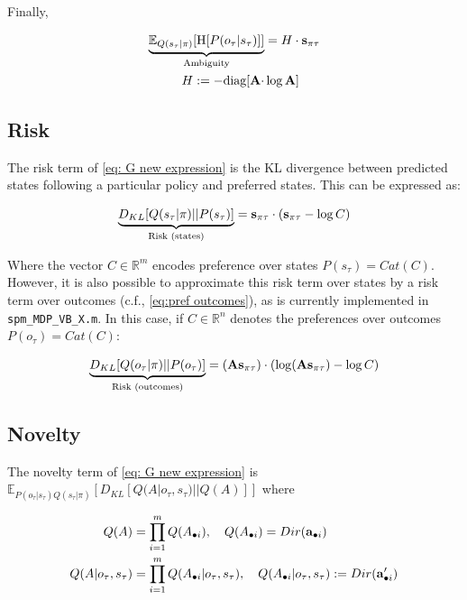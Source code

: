 \documentclass{article}
\begin{document}
	Finally,
	
	\begin{equation}
	\begin{split}
	 		\underbrace{\mathbb E_{Q(s_\tau|\pi)} [\text{H}[P(o_\tau |s_\tau)]]}_{\text{Ambiguity}} &= H\cdot \bold s_{\pi \tau} \\
	 		H := - \text{diag} [\bold A \cdot & \log \bold A ]
	\end{split}
	\end{equation}

	
	\subsection{Risk}
	
	The risk term of \eqref{eq: G new expression} is the KL divergence between predicted states following a particular policy and preferred states. This can be expressed as:
	
	\begin{equation}
		\underbrace{D_{KL}[Q(s_\tau|\pi)||P(s_\tau)]}_{\text{Risk (states)}}= \bold s_{\pi\tau} \cdot (\bold s_{\pi\tau} - \log C)
	\end{equation}
	
	Where the vector $C \in \mathbb R^m$ encodes preference over states $P(s_\tau)=Cat(C)$. However, it is also possible to approximate this risk term over states by a risk term over outcomes (c.f., \eqref{eq:pref outcomes}), as is currently implemented in \texttt{spm\_MDP\_VB\_X.m}. In this case, if $C \in \mathbb R^n$ denotes the preferences over outcomes $P(o_\tau)=Cat(C)$:
	
	\begin{equation}
		\underbrace{D_{KL}[Q(o_\tau|\pi)||P(o_\tau)]}_{\text{Risk (outcomes)}} =(\bold A \bold s_{\pi\tau}) \cdot ( \log (\bold A \bold s_{\pi\tau}) - \log C)
	\end{equation}
	
	
	\subsection{Novelty}
	
The novelty term of \eqref{eq: G new expression} is ${\mathbb E_{P(o_\tau|s_\tau)Q(s_\tau|\pi)}[D_{KL}[Q(A|o_\tau,s_\tau)||Q(A)]]}$ where
	
	\begin{align}
		Q(A) &= \prod_{i=1}^m Q(A_{\bullet i}), \quad Q(A_{\bullet i}) = Dir(\bold a_{\bullet i}) \\
		Q(A|o_\tau, s_\tau) &= \prod_{i=1}^m Q(A_{\bullet i}|o_\tau, s_\tau), \quad Q(A_{\bullet i}|o_\tau, s_\tau) := Dir(\bold a'_{\bullet i}) 
	\end{align}
	
\end{document}
